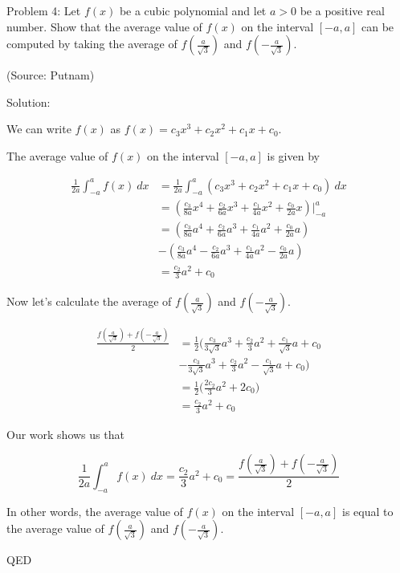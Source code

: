 Problem 4: Let $f(x)$ be a cubic polynomial and let $a > 0$ be a positive real number. Show that the average value of $f(x)$ on the interval $[-a, a]$ can be computed by taking the average of $f(\frac{a}{\sqrt3})$ and $f(-\frac{a}{\sqrt3})$.

(Source: Putnam)

Solution:

We can write $f(x)$ as $f(x) = c_3x^3 + c_2x^2 + c_1x + c_0$.

The average value of $f(x)$ on the interval $[-a, a]$ is given by

\begin{align*}
\frac{1}{2a} \int_{-a}^{a} f(x) \ dx &= \frac{1}{2a} \int_{-a}^{a} \left( c_3x^3 + c_2x^2 + c_1x + c_0 \right) \ dx \\ 
&= \left( \frac{c_3}{8a} x^4 + \frac{c_2}{6a} x^3 + \frac{c_1}{4a} x^2 + \frac{c_0}{2a} x \right) \Bigg|_{-a}^{a} \\
&= \left( \frac{c_3}{8a} a^4 + \frac{c_2}{6a} a^3 + \frac{c_1}{4a} a^2 + \frac{c_0}{2a} a \right) \\
&- \left( \frac{c_3}{8a} a^4 - \frac{c_2}{6a} a^3 + \frac{c_1}{4a} a^2 - \frac{c_0}{2a} a \right) \\
&= \frac{c_2}{3} a^2 + c_0
\end{align*}

Now let's calculate the average of $f(\frac{a}{\sqrt3})$ and $f(-\frac{a}{\sqrt3})$.

\begin{align*}
\frac{f(\frac{a}{\sqrt3}) + f(-\frac{a}{\sqrt3})}{2} &= \frac{1}{2} \Bigg( \frac{c_3}{3 \sqrt 3} a^3 + \frac{c_2}{3} a^2 + \frac{c_1}{\sqrt 3} a + c_0 \\
&- \frac{c_3}{3 \sqrt 3} a^3 + \frac{c_2}{3} a^2 - \frac{c_1}{\sqrt 3} a + c_0 \Bigg) \\
&= \frac{1}{2} \Bigg( \frac{2c_2}{3} a^2 + 2c_0 \Bigg) \\
&= \frac{c_2}{3} a^2 + c_0
\end{align*}

Our work shows us that

$$\frac{1}{2a} \int_{-a}^{a} f(x) \ dx = \frac{c_2}{3} a^2 + c_0 = \frac{f(\frac{a}{\sqrt3}) + f(-\frac{a}{\sqrt3})}{2}$$

In other words, the average value of $f(x)$ on the interval $[-a, a]$ is equal to the average value of $f(\frac{a}{\sqrt3})$ and $f(-\frac{a}{\sqrt3})$. 

QED
